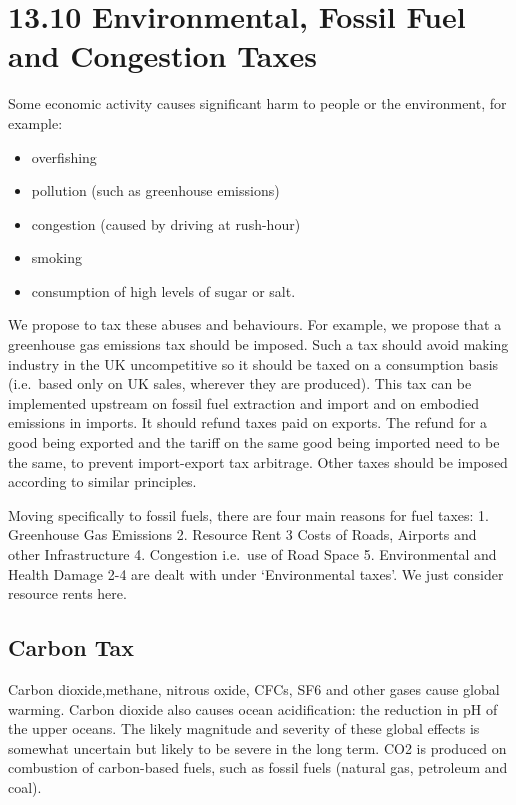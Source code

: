 \documentclass[]{tufte-handout}
\providecommand{\tightlist}{%
  \setlength{\itemsep}{0pt}\setlength{\parskip}{0pt}}
\begin{document}
\hypertarget{environmental-fossil-fuel-and-congestion-taxes}{%
\section{13.10 Environmental, Fossil Fuel and Congestion
Taxes}\label{environmental-fossil-fuel-and-congestion-taxes}}

Some economic activity causes significant harm to people or the
environment, for example:

\begin{itemize}
\tightlist
\item
  overfishing
\item
  pollution (such as greenhouse emissions)
\item
  congestion (caused by driving at rush-hour)
\item
  smoking
\item
  consumption of high levels of sugar or salt.
\end{itemize}

We propose to tax these abuses and behaviours. For example, we propose
that a greenhouse gas emissions tax should be imposed. Such a tax should
avoid making industry in the UK uncompetitive so it should be taxed on a
consumption basis (i.e.~based only on UK sales, wherever they are
produced). This tax can be implemented upstream on fossil fuel
extraction and import and on embodied emissions in imports. It should
refund taxes paid on exports. The refund for a good being exported and
the tariff on the same good being imported need to be the same, to
prevent import-export tax arbitrage. Other taxes should be imposed
according to similar principles.

Moving specifically to fossil fuels, there are four main reasons for
fuel taxes: 1. Greenhouse Gas Emissions 2. Resource Rent 3 Costs of
Roads, Airports and other Infrastructure 4. Congestion i.e.~use of Road
Space 5. Environmental and Health Damage 2-4 are dealt with under
`Environmental taxes'. We just consider resource rents here.

\hypertarget{carbon-tax}{%
\subsection{Carbon Tax}\label{carbon-tax}}

Carbon dioxide,methane, nitrous oxide, CFCs, SF6 and other gases cause
global warming. Carbon dioxide also causes ocean acidification: the
reduction in pH of the upper oceans. The likely magnitude and severity
of these global effects is somewhat uncertain but likely to be severe in
the long term. CO2 is produced on combustion of carbon-based fuels, such
as fossil fuels (natural gas, petroleum and coal).
\end{document}
